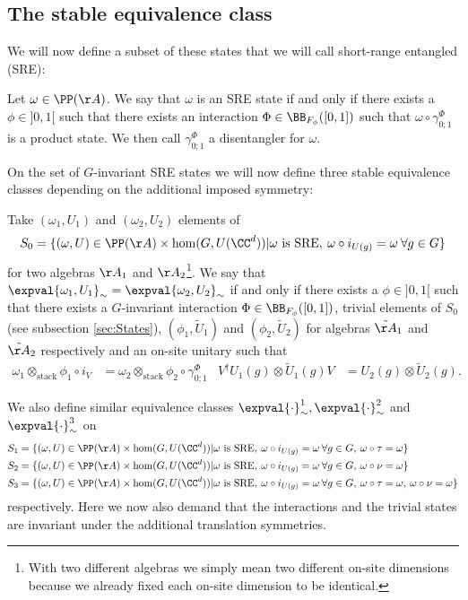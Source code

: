 \subsection{The stable equivalence class}\label{sec:StableEquivalenceClasses}
We will now define a subset of these states that we will call short-range entangled (SRE):
\begin{definition}\label{def:sre}
	Let $\omega\in\PP(\AA)$. We say that $\omega$ is an SRE state if and only if there exists a $\phi\in]0,1[$ such that there exists an interaction $\Phi\in\BB_{F_\phi}([0,1])$ such that $\omega\circ\gamma^\Phi_{0;1}$ is a product state. We then call $\gamma^\Phi_{0;1}$ a disentangler for $\omega$.
\end{definition}
On the set of $G$-invariant SRE states we will now define three stable equivalence classes depending on the additional imposed symmetry:
\begin{definition}
	Take $(\omega_1,U_1)$ and $(\omega_2,U_2)$ elements of
	\begin{equation}
		S_0=\{(\omega,U)\in\PP(\AA)\times\hom(G,U(\CC^d))|\omega\text{ is SRE},\:\omega\circ i_{U(g)}=\omega\:\forall g\in G\}
	\end{equation}
	for two algebras $\AA_1$ and $\AA_2$\footnote{With two different algebras we simply mean two different on-site dimensions because we already fixed each on-site dimension to be identical.}. We say that $\expval{\omega_1,U_1}_\sim=\expval{\omega_2,U_2}_\sim$ if and only if there exists a $\phi\in]0,1[$ such that there exists a $G$-invariant interaction $\Phi\in\BB_{F_\phi}([0,1])$, trivial elements of $S_0$ (see subsection \ref{sec:States}), $(\phi_1,\tilde U_1)$ and $(\phi_2,\tilde U_2)$ for algebras $\tilde\AA_1$ and $\tilde\AA_2$ respectively and an on-site unitary such that
	\begin{align}
		\omega_1\otimes_{\text{stack}}\phi_1\circ i_V&=\omega_2\otimes_{\text{stack}}\phi_2\circ\gamma^\Phi_{0;1}&V^\dagger U_{1}(g)\otimes \tilde{U}_{1}(g)V&=U_{2}(g)\otimes \tilde{U}_{2}(g).
	\end{align}
\end{definition}
We also define similar equivalence classes $\expval{\cdot}_\sim^1,\expval{\cdot}_\sim^2$ and $\expval{\cdot}_\sim^3$ on
\begin{align}
	\nonumber
	S_1&=\{(\omega,U)\in\PP(\AA)\times\hom(G,U(\CC^d))|\omega\text{ is SRE},\:\omega\circ i_{U(g)}=\omega\:\forall g\in G,\:\omega\circ\tau=\omega\}\\
	S_2&=\{(\omega,U)\in\PP(\AA)\times\hom(G,U(\CC^d))|\omega\text{ is SRE},\:\omega\circ i_{U(g)}=\omega\:\forall g\in G,\:\omega\circ\nu=\omega\}\\
	\nonumber
	S_3&=\{(\omega,U)\in\PP(\AA)\times\hom(G,U(\CC^d))|\omega\text{ is SRE},\:\omega\circ i_{U(g)}=\omega\:\forall g\in G,\:\omega\circ\tau=\omega,\:\omega\circ\nu=\omega\}
\end{align}
respectively. Here we now also demand that the interactions and the trivial states are invariant under the additional translation symmetries.
